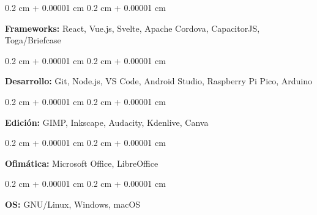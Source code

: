 \documentclass[12pt, letterpaper]{article}
\newenvironment{onecolentry}{
    \begin{adjustwidth}{
        0.2 cm + 0.00001 cm
    }{
        0.2 cm + 0.00001 cm
    }
}{
    \end{adjustwidth}
} %
\begin{document}
\vspace{0.2 cm}

\begin{onecolentry}
    \textbf{Frameworks:} React, Vue.js, Svelte, Apache Cordova, CapacitorJS, Toga/Briefcase
\end{onecolentry}

\vspace{0.2 cm}

\begin{onecolentry}
    \textbf{Desarrollo:} Git, Node.js, VS Code, Android Studio, Raspberry Pi Pico, Arduino
\end{onecolentry}

\vspace{0.2 cm}

\begin{onecolentry}
    \textbf{Edición:} GIMP, Inkscape, Audacity, Kdenlive, Canva
\end{onecolentry}

\vspace{0.2 cm}

\begin{onecolentry}
    \textbf{Ofimática:} Microsoft Office, LibreOffice
\end{onecolentry}

\vspace{0.2 cm}

\begin{onecolentry}
    \textbf{OS:} GNU/Linux, Windows, macOS
\end{onecolentry}
\end{document}
